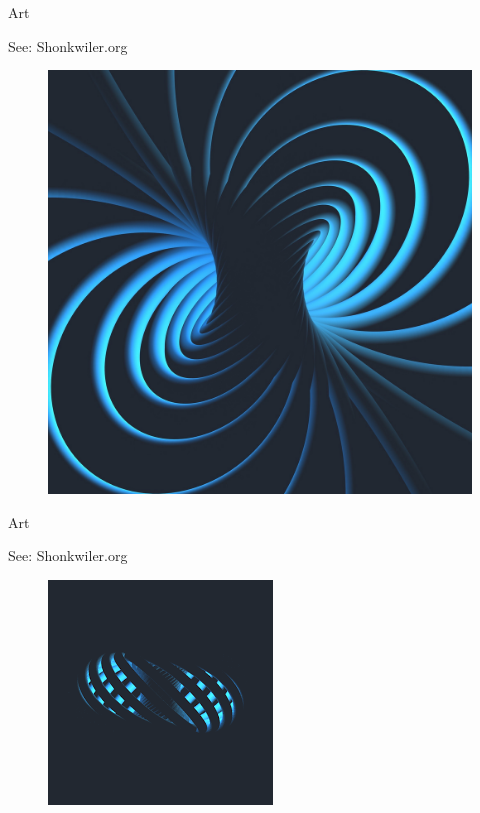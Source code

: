 \documentclass[usenames,dvipsnames]{beamer}
\theoremstyle{definition}
\theoremstyle{theorem}
\begin{document}
    \begin{frame}{Art}
    \begin{center}
        See: Shonkwiler.org
        \begin{figure}
            \centering
            \includegraphics[width=.6\textwidth]{Recruitment_Day/33700724514_35273ae7ca_b.jpg}
        \end{figure}
        \end{center}
    \end{frame}
    
        \begin{frame}{Art}
    \begin{center}
        See: Shonkwiler.org
        \begin{figure}
            \centering
            \includegraphics[width=.6\textwidth]{Recruitment_Day/download.png}
        \end{figure}
        \end{center}
    \end{frame}
    
\end{document}
